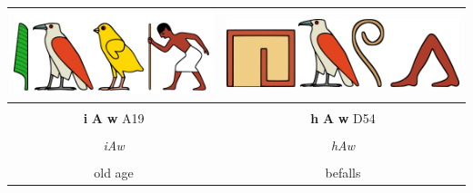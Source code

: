 \begin{center}
\begin{tabularx}{\linewidth}{cc}
	\includegraphics[scale=0.5]{word-images/1-3-1-iAw} &
	\includegraphics[scale=0.5]{word-images/1-3-2-hAw} \\
	\hline \\ 
	\textbf{i} \textbf{A} \textbf{w} A19 &
	\textbf{h} \textbf{A} \textbf{w} D54 \\
	\hline \\ 
	\textit{iAw} & \textit{hAw}\\
	\hline \\ 
	old age & befalls
\end{tabularx}

\end{center}

